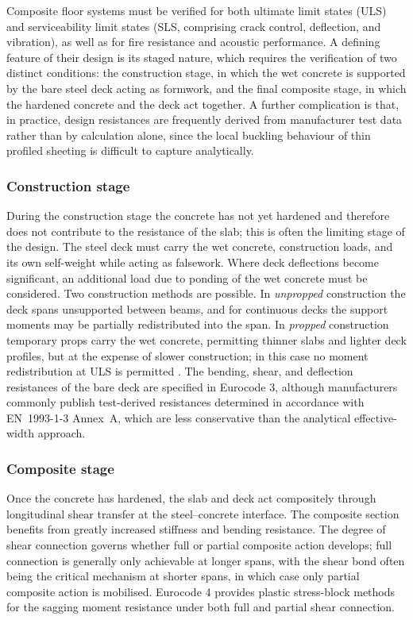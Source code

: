 Composite floor systems must be verified for both ultimate limit states (ULS) and serviceability limit states (SLS, comprising crack control, deflection, and vibration), as well as for fire resistance and acoustic performance. A defining feature of their design is its staged nature, which requires the verification of two distinct conditions: the construction stage, in which the wet concrete is supported by the bare steel deck acting as formwork, and the final composite stage, in which the hardened concrete and the deck act together. A further complication is that, in practice, design resistances are frequently derived from manufacturer test data rather than by calculation alone, since the local buckling behaviour of thin profiled sheeting is difficult to capture analytically.

\subsubsection*{Construction stage}
During the construction stage the concrete has not yet hardened and therefore does not contribute to the resistance of the slab; this is often the limiting stage of the design. The steel deck must carry the wet concrete, construction loads, and its own self-weight while acting as falsework. Where deck deflections become significant, an additional load due to ponding of the wet concrete must be considered. Two construction methods are possible. In \textit{unpropped} construction the deck spans unsupported between beams, and for continuous decks the support moments may be partially redistributed into the span. In \textit{propped} construction temporary props carry the wet concrete, permitting thinner slabs and lighter deck profiles, but at the expense of slower construction; in this case no moment redistribution at ULS is permitted \citep{RefWorks:hicks2008en}. The bending, shear, and deflection resistances of the bare deck are specified in Eurocode 3, although manufacturers commonly publish test-derived resistances determined in accordance with EN~1993-1-3 Annex~A, which are less conservative than the analytical effective-width approach.

\subsubsection*{Composite stage}
Once the concrete has hardened, the slab and deck act compositely through longitudinal shear transfer at the steel--concrete interface. The composite section benefits from greatly increased stiffness and bending resistance. The degree of shear connection governs whether full or partial composite action develops; full connection is generally only achievable at longer spans, with the shear bond often being the critical mechanism at shorter spans, in which case only partial composite action is mobilised. Eurocode 4 provides plastic stress-block methods for the sagging moment resistance under both full and partial shear connection.

